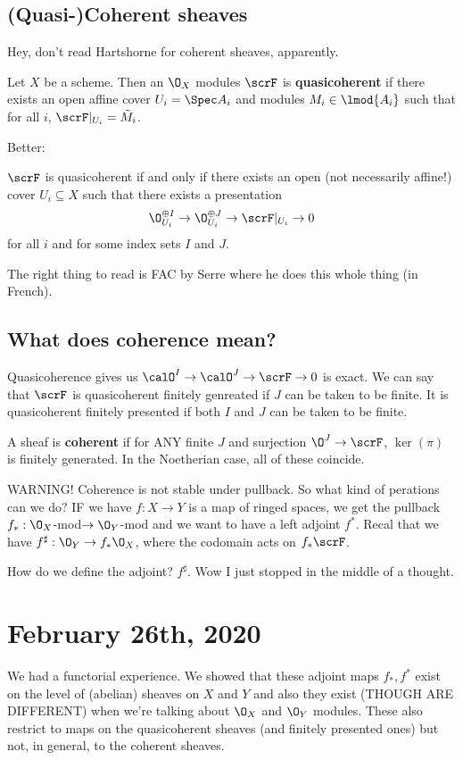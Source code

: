 \documentclass[12pt]{article}
\begin{document}
\subsection{(Quasi-)Coherent sheaves}
Hey, don't read Hartshorne for coherent sheaves, apparently.

\begin{defn}
	Let $X$ be a scheme. Then an $\O_X$ modules $\scrF$ is \textbf{quasicoherent} if there exists an open affine cover $U_i=\Spec A_i$ and modules $M_i\in\lmod{A_i}$
	such that for all $i$, $\scrF|_{U_i}=\tilde M_i$.
\end{defn}
Better:
\begin{defn}
	$\scrF$ is quasicoherent if and only if there exists an open (not necessarily affine!) cover $U_i\subseteq X$ such that there exists a presentation 
	\[\O_{U_i}^{\oplus I}\to \O_{U_i}^{\oplus J}\to \scrF|_{U_i}\to 0\]
	for all $i$ and for some index sets $I$ and $J$.
\end{defn}

The right thing to read is FAC by Serre where he does this whole thing (in French).

\subsection{What does coherence mean?}
Quasicoherence gives us $\calO^I\to\calO^J\to \scrF\to 0$ is exact. We can say that $\scrF$ is quasicoherent finitely genreated if $J$ can be taken 
to be finite. It is quasicoherent finitely presented if both $I$ and $J$ can be taken to be finite.

A sheaf is \textbf{coherent} if for ANY finite $J$ and surjection $\O^J\to \scrF$, $\ker(\pi)$ is finitely generated.
In the Noetherian case, all of these coincide. 

WARNING! Coherence is not stable under pullback. So what kind of perations can we do? IF we have $f:X\to Y$ is a map of ringed spaces, we get the pullback $f_\ast:\O_X$-mod$\to\O_Y$-mod and we want to have a left 
adjoint $f^\ast$. Recal that we have $f^\sharp:\O_Y\to f_\ast\O_X$, where the codomain acts on $f_\ast\scrF$.

How do we define the adjoint? $f^\sharp$. Wow I just stopped in the middle of a thought.

\section{February 26th, 2020}
We had a functorial experience. We showed that these adjoint maps $f_\ast,f^\ast$ exist on the level of (abelian)
sheaves on $X$ and $Y$ and also they exist (THOUGH ARE DIFFERENT) when we're talking about $\O_X$ and $\O_Y$ modules. 
These also restrict to maps on the quasicoherent sheaves (and finitely presented ones) but not, in general, to the coherent sheaves.
\end{document}
